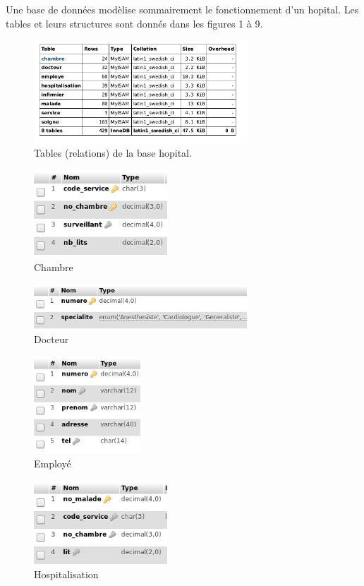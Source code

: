 Une base de données modèlise sommairement le fonctionnement d'un hopital. Les tables et leurs structures sont donnés dans les figures 1 à 9.
\begin{figure}[h]
  \centering
  \includegraphics[width=8cm]{./Ehopital_1.fig.png}
  \caption{Tables (relations) de la base \og hopital\fg.}
  \label{fig:hop_1}
\end{figure}
\begin{figure}
 \centering
 \includegraphics[width=5cm]{./Ehopital_2.fig.png}
 \caption{Chambre}
 \label{fig:hop_2}
\end{figure}
\begin{figure}
 \centering
 \includegraphics[width=8cm]{./Ehopital_3.fig.png}
 \caption{Docteur}
 \label{fig:hop_3}
\end{figure}
\begin{figure}
 \centering
 \includegraphics[width=4cm]{./Ehopital_4.fig.png}
 \caption{Employé}
 \label{fig:hop_4}
\end{figure}
\begin{figure}
 \centering
 \includegraphics[width=5cm]{./Ehopital_5.fig.png}
 \caption{Hospitalisation}
 \label{fig:hop_5}
\end{figure}
